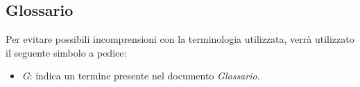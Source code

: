 \subsection{Glossario}
    Per evitare possibili incomprensioni con la terminologia utilizzata, verrà utilizzato il seguente simbolo a pedice:
    \begin{itemize}
        \item \textit{G}: indica un termine presente nel documento \textit{Glossario}.  
    \end{itemize}
